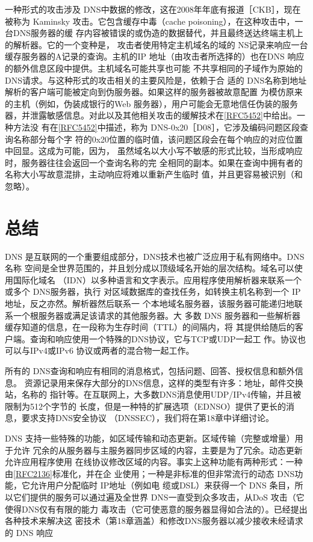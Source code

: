 一种形式的攻击涉及 DNS中数据的修改，这在2008年年底有报道［CKB］，现在被称为
Kaminsky 攻击。它包含缓存中毒（cache poisoning），在这种攻击中，一台DNS服务器的缓
存内容被错误的或伪造的数据替代，并且最终送达终端主机上的解析器。它的一个变种是，
攻击者使用特定主机域名的域的 NS记录来响应一台缓存服务器的A记录的查询。主机的IP
地址（由攻击者所选择的）也在DNS 响应的额外信息区段中提供。主机域名可能共享也可能
不共享相同的子域作为原始的 DNS请求。与这种形式的攻击相关的主要风险是，依赖于合
适的 DNS名称到地址解析的客户端可能被定向到伪服务器。如果这样的服务器被故意配置
为模仿原来的主机（例如，伪装成银行的Web 服务器），用户可能会无意地信任伪装的服务
器，并泄露敏感信息。对此以及其他相关攻击的缓解技术在\href{https://www.rfc-editor.org/rfc/rfc5452}{[RFC5452]}中给出。一种方法没
有在\href{https://www.rfc-editor.org/rfc/rfc5452}{[RFC5452]}中描述，称为
DNS-0x20［D08］，它涉及编码问题区段查询名称部分每个字
符的0x20位置的临时值，该问题区段会在每个响应的对应位置中回显。这成为可能，因为，
虽然域名以大小写不敏感的形式比较，当形成响应时，服务器往往会返回一个查询名称的完
全相同的副本。如果在查询中拥有者的名称大小写故意混排，主动响应将难以重新产生临时
值，并且更容易被识别（和忽略）。

\section{总结}

DNS 是互联网的一个重要组成部分，DNS技术也被广泛应用于私有网络中。DNS名称
空间是全世界范围的，并且划分成以顶级域名开始的层次结构。域名可以使用国际化域名
（IDN）以多种语言和文字表示。应用程序使用解析器来联系一个或多个 DNS服务器，执行
对区域数据库的查找任务，如转换主机名称到一个 IP 地址，反之亦然。解析器然后联系一
个本地域名服务器，该服务器可能递归地联系一个根服务器或满足该请求的其他服务器。大
多数 DNS 服务器和一些解析器缓存知道的信息，在一段称为生存时间（TTL）的间隔内，将
其提供给随后的客户端。查询和响应使用一个特殊的DNS协议，它与TCP或UDP一起工
作。协议也可以与IPv4或IPv6 协议或两者的混合物一起工作。

所有的 DNS查询和响应有相同的消息格式，包括问题、回答、授权信息和额外信息。
资源记录用来保存大部分的DNS信息，这样的类型有许多：地址，邮件交换站，名称的
指针等。在互联网上，大多数DNS消息使用UDP/IPv4传输，并且被限制为512个字节的
长度，但是一种特的扩展选项（EDNSO）提供了更长的消息，要求支持DNS安全协议
（DNSSEC），我们将在第18章中详细讨论。

DNS 支持一些特殊的功能，如区域传输和动态更新。区域传输（完整或增量）用于允许
冗余的从服务器与主服务器同步区域的内容，主要是为了冗余。动态更新允许应用程序使用
在线协议修改区域的内容。事实上这种功能有两种形式：一种由\href{https://www.rfc-editor.org/rfc/rfc2136}{[RFC2136]}标准化，并在企
业使用；一种是非标准的但非常流行的动态 DNS功能，它允许用户分配临时 IP地址（例如电
缆或DSL）来获得一个 DNS 条目，所以它们提供的服务可以通过遍及全世界
DNS一直受到众多攻击，从DoS 攻击（它使得DNS仅有有限的能力
毒攻击（它可使恶意的服务器显得如合法的）。已经提出各种技术来解决这
密技术（第18章涵盖）和修改DNS服务器以减少接收未经请求的 DNS 响应

